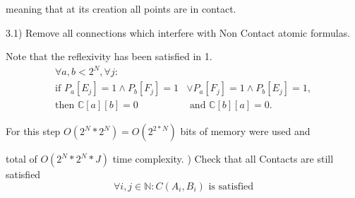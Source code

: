\documentclass{article}
\begin{document}
			meaning that at its creation all points are in contact.
			\newline
	
			3.1) Remove all connections which interfere with Non Contact atomic formulas.
				\newline

				Note that the reflexivity has been satisfied in 1.
				\begin{align*}
					\forall a, b < 2^N, \forall j :& \\
						\text{if } P_a [E_j] = 1 \wedge P_b [F_j] = 1 &\vee P_a[F_j] = 1 \wedge P_b[E_j] = 1, \\
						\text{then } \mathbb{C}[a][b] = 0 &\text{ and } \mathbb{C}[b][a] = 0.
				\end{align*} 

			For this step $O(2^N * 2^N) = O(2^{2*N})$ bits of memory were used and 

			total of $O(2^N * 2^N * J)$ time complexity.
			\newline
			) Check that all Contacts are still satisfied
			\begin{equation}
				\forall i, j \in \mathbb{N}: C(A_i, B_i) \text{ is satisfied}
			\end{equation}
			
\end{document}
